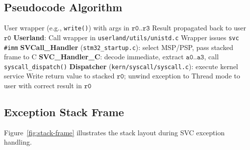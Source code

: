\documentclass[11pt,a4paper]{article}
\newcommand{\file}[1]{\texttt{#1}}
\begin{document}
\subsection{Pseudocode Algorithm}
\begin{algorithm}[h]
  \caption{End-to-End SVC Request Path}\label{alg:svc-path}
  \begin{algorithmic}[1]
    \Require User wrapper (e.g., \texttt{write()}) with args in \(\texttt{r0..r3}\)
    \Ensure Result propagated back to user \(\texttt{r0}\)
    \State \textbf{Userland}: Call wrapper in \file{userland/utils/unistd.c}
    \State Wrapper issues \texttt{svc \#imm} 
    \State \textbf{SVCall\_Handler} (\file{stm32\_startup.c}): select MSP/PSP, pass stacked frame to C
    \State \textbf{SVC\_Handler\_C}: decode immediate, extract \(\texttt{a0..a3}\), call \texttt{syscall\_dispatch()}
    \State \textbf{Dispatcher} (\file{kern/syscall/syscall.c}): execute kernel service
    \State Write return value to stacked \(\texttt{r0}\); unwind exception to Thread mode
    \State \Return to user with correct result in \(\texttt{r0}\)
  \end{algorithmic}
\end{algorithm}

\subsection{Exception Stack Frame}
Figure~\ref{fig:stack-frame} illustrates the stack layout during SVC exception handling.
\end{document}
